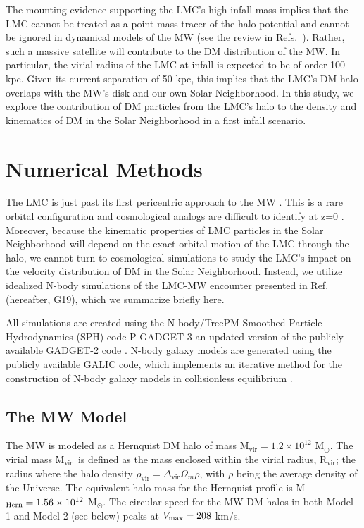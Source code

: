 \documentclass[letterpaper,11pt]{article}
\newcommand{\Mvir}{M$_{\textrm{vir}}$}
\begin{document}
The mounting evidence supporting the LMC's high infall mass
implies that the LMC cannot be treated as a point mass tracer of the halo potential and cannot be ignored in dynamical models of the MW (see the review in Refs.~\cite{G19,Besla:2015}). Rather, such a massive satellite will contribute to the DM distribution of the MW. In particular, the virial radius of the LMC at infall is expected to be of order 100 kpc.  Given its current separation of 50 kpc, this implies that the LMC's DM halo overlaps with the MW's disk and our own Solar Neighborhood. In this study, we explore the contribution of DM particles
from the LMC's halo to the density and kinematics of DM 
in the Solar Neighborhood in a first infall scenario. 




\section{Numerical Methods}
\label{sec:Numerical}
The LMC is just past its first pericentric approach to the MW \citep{Kallivayalil:2013, Besla:2007}. This is a rare orbital configuration and cosmological analogs are difficult to identify at z=0 \citep{Patel:2017}.
Moreover, because the kinematic properties of LMC particles in the Solar Neighborhood 
will depend on the exact orbital motion of the LMC through the halo, we cannot turn to cosmological simulations to study the LMC's impact on the velocity distribution of DM in
the Solar Neighborhood. Instead, we utilize idealized N-body simulations of the LMC-MW encounter presented in Ref. \cite{G19} (hereafter, G19), which we summarize briefly here.  

All simulations are created using the N-body/TreePM Smoothed Particle Hydrodynamics (SPH) code P-GADGET-3
an updated version of the publicly available GADGET-2 code \citep{Springel:2005}. N-body galaxy models are generated using the publicly available GALIC code, which implements an iterative method for the construction of N-body galaxy models in collisionless equilibrium \citep{Yurin:2014}.



 
\subsection{The MW Model}
 \label{sec:MW}
 
 The MW is modeled as a Hernquist DM halo \citep{Hernquist:1990} of 
 mass \Mvir $= 1.2 \times 10^{12}$ M$_\odot$. The virial
mass \Mvir~is defined as the mass enclosed within the virial radius, 
R$_{\textrm{vir}}$; the radius where the halo density 
$\rho_{\textrm{vir}} = \Delta_{\textrm{vir}} \Omega_m \rho$, with $\rho$ being
the average density of the Universe. The equivalent halo mass for the Hernquist
profile is M$_{\rm Hern} = 1.56\times 10^{12}$ M$_\odot$.
The circular speed for the MW DM halos in both 
Model 1 and Model 2 (see below) peaks at $V_{\rm max} = 208$ km/s. 
\end{document}
